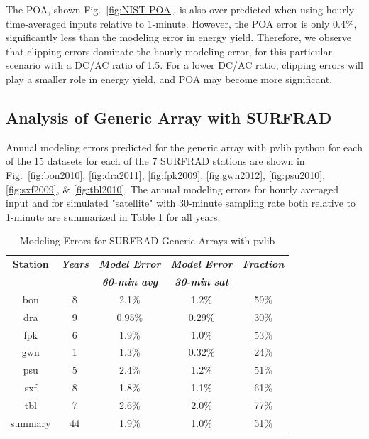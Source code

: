 \documentclass[conference]{IEEEtran}
\begin{document}
The POA, shown Fig.~\ref{fig:NIST-POA}, is also over-predicted when using hourly time-averaged inputs relative to 1-minute. However, the POA error is only 0.4\%, significantly less than the modeling error in energy yield. Therefore, we observe that clipping errors dominate the hourly modeling error, for this particular scenario with a DC/AC ratio of 1.5. For a lower DC/AC ratio, clipping errors will play a smaller role in energy yield, and POA may become more significant.

\subsection{Analysis of Generic Array with SURFRAD}
Annual modeling errors predicted for the generic array with pvlib python for each of the 15 datasets for each of the 7 SURFRAD stations are shown in Fig.~\ref{fig:bon2010}, \ref{fig:dra2011}, \ref{fig:fpk2009}, \ref{fig:gwn2012}, \ref{fig:psu2010}, \ref{fig:sxf2009}, \& \ref{fig:tbl2010}. The annual modeling errors for hourly averaged input and for simulated "satellite" with 30-minute sampling rate both relative to 1-minute are summarized in Table  \ref{table:SURFRAD-summary} for all years.

\begin{table}[htbp]
\caption{Modeling Errors for SURFRAD Generic Arrays with pvlib}
\begin{center}
\begin{tabular}{|c|c|c|c|c|}
\hline
\textbf{Station}& \textbf{\textit{Years}}& \textbf{\textit{Model Error}}& \textbf{\textit{Model Error}}& \textbf{\textit{Fraction}} \\
                &                        & \textbf{\textit{60-min avg}} & \textbf{\textit{30-min sat}} &                                \\
\hline
bon  & 8 & 2.1\% & 1.2\% & 59\% \\
dra  & 9 & 0.95\%& 0.29\%& 30\% \\
fpk  & 6 & 1.9\% & 1.0\% & 53\% \\
gwn  & 1 & 1.3\% & 0.32\%& 24\% \\
psu  & 5 & 2.4\% & 1.2\% & 51\% \\
sxf  & 8 & 1.8\% & 1.1\% & 61\% \\
tbl  & 7 & 2.6\% & 2.0\% & 77\% \\
\hline
summary& 44& 1.9\% & 1.0\% & 51\% \\
\hline
\end{tabular}
\label{table:SURFRAD-summary}
\end{center}
\end{table}
\end{document}
